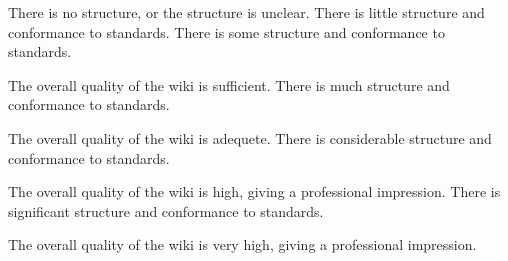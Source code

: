 \documentclass{../../fal_assignment}
\begin{document}
\begin{markingrubric}
%
        \grade\fail 	There is no structure, or the structure is unclear.
        \grade 		There is little structure and conformance to standards.
        \grade 		There is some structure and conformance to standards.
        \par 		The overall quality of the wiki is sufficient.
        \grade 		There is much structure and conformance to standards.
        \par 		The overall quality of the wiki is adequete.
        \grade 		There is considerable structure and conformance to standards.
        \par 		The overall quality of the wiki is high, giving a professional impression.
        \grade 		There is significant structure and conformance to standards.
        \par 		The overall quality of the wiki is very high, giving a professional impression.
\end{markingrubric}
\end{document}
